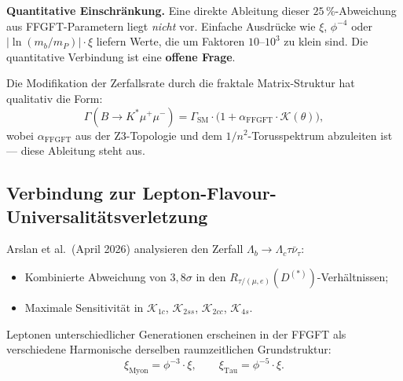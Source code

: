 \begin{warnbox}
\textbf{Quantitative Einschränkung.}
Eine direkte Ableitung dieser $25\,\%$-Abweichung aus FFGFT-Parametern
liegt \emph{nicht} vor. Einfache Ausdrücke wie $\xi$, $\phi^{-4}$ oder
$|\ln(m_b/m_P)|\cdot\xi$ liefern Werte, die um Faktoren $10$--$10^3$ zu
klein sind. Die quantitative Verbindung ist eine \textbf{offene Frage}.
\end{warnbox}

Die Modifikation der Zerfallsrate durch die fraktale Matrix-Struktur
hat qualitativ die Form:
\begin{equation}
  \Gamma(B\to K^*\mu^+\mu^-)
  = \Gamma_{\text{SM}} \cdot
    \bigl(1 + \alpha_{\text{FFGFT}} \cdot \mathcal{K}(\theta)\bigr),
\end{equation}
wobei $\alpha_{\text{FFGFT}}$ aus der Z3-Topologie und dem
$1/n^2$-Torusspektrum abzuleiten ist — diese Ableitung steht aus.

\subsection{Verbindung zur Lepton-Flavour-Universalitätsverletzung}

Arslan et al.\ (April 2026) \cite{Arslan2026} analysieren den Zerfall
$\Lambda_b \to \Lambda_c\tau\bar{\nu}_\tau$:
\begin{itemize}
  \item Kombinierte Abweichung von $3{,}8\sigma$ in den
        $R_{\tau/(\mu,e)}(D^{(*)})$-Verhältnissen;
  \item Maximale Sensitivität in
        $\mathcal{K}_{1c}$, $\mathcal{K}_{2ss}$, $\mathcal{K}_{2cc}$,
        $\mathcal{K}_{4s}$.
\end{itemize}

Leptonen unterschiedlicher Generationen erscheinen in der FFGFT als
verschiedene Harmonische derselben raumzeitlichen Grundstruktur:
\begin{equation}
  \xi_{\text{Myon}} = \phi^{-3}\cdot\xi, \qquad
  \xi_{\text{Tau}}  = \phi^{-5}\cdot\xi.
\end{equation}

\begin{table}[H]
\centering
\caption{Leptonen als Harmonische der Grundfrequenz~$\xi$}
\smallskip
{}
\end{table}


